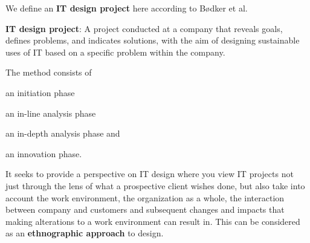 We define an \textbf{IT design project} here according to B\o dker et al.\ 
\vspace{5mm}
\begin{framed}
    \textbf{IT design project}: A project conducted at a company that reveals
    goals, defines problems, and indicates solutions, with the aim of designing
    sustainable uses of IT based on a specific problem within the company.\cite{bodker2004participatory}
\end{framed}
\vspace{5mm}
The \must{}\cite{bodker2004participatory} method consists of
\begin{inparaenum}[1)]
    \item an initiation phase
    \item an in-line analysis phase
    \item an in-depth analysis phase and
    \item an innovation phase.
\end{inparaenum}
It seeks to provide a perspective on IT design where you view IT projects not
just through the lens of what a prospective client wishes done, but also take into
account the work environment, the organization as a whole, the interaction
between company and customers and subsequent changes and impacts that making
alterations to a work environment can result in. This can be considered as an 
\textbf{ethnographic approach} to design.

